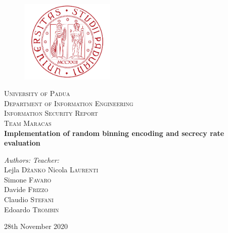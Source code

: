 \documentclass{report}
\begin{document}
\begin{titlepage}
\begin{center}
\vspace*{0.8cm}
\begin{figure}[H]
\centering
\includegraphics[width=0.4\textwidth]{logo_uni}
\end{figure}
\LARGE{\textsc{University of Padua}}\\
\vspace*{0.1cm}
\Large{\textsc{Department of Information Engineering}}\\
\vspace*{1.8cm}
\Large{\textsc{Information Security Report}}\\
\vspace*{0.1cm}
\Large{\textsc{Team Maracas}}\\
\vspace*{0.8cm}
\huge{\textbf{Implementation of random binning encoding and secrecy rate evaluation 
}}\\
\vspace*{1cm}
\end{center}
\large{\textit{Authors:}}
\hfill
\large{\textit{Teacher:}} \\
\large{Lejla \textsc{D\v{z}anko}}
\hfill
\large{Nicola \textsc{Laurenti}}\\
\large{Simone \textsc{Favaro}}\\
\large{Davide \textsc{Frizzo}}\\
\large{Claudio \textsc{Stefani}}\\
\large{Edoardo \textsc{Trombin}}\\

\begin{center}
\large{28th November 2020}\\
\end{center}
\end{titlepage}
\pagebreak




\setcounter{page}{1}
\end{document}
